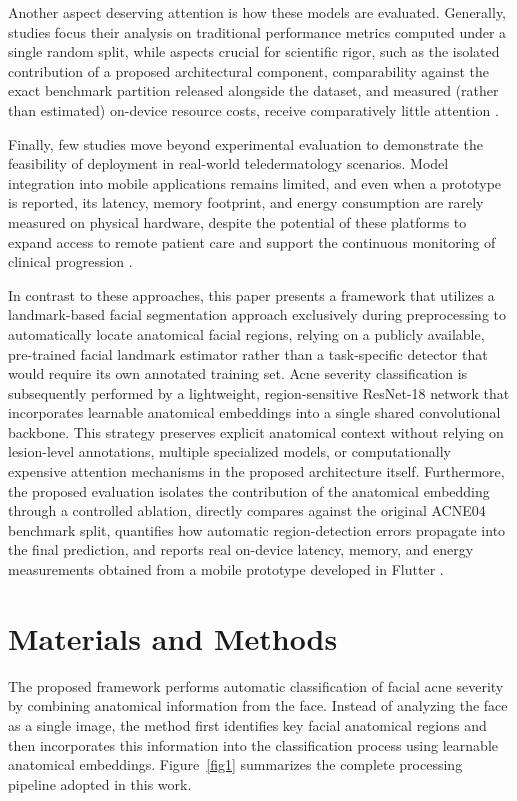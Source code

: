 \documentclass[conference]{IEEEtran}
\begin{document}
Another aspect deserving attention is how these models are evaluated. Generally, studies focus their analysis on traditional performance metrics computed under a single random split, while aspects crucial for scientific rigor, such as the isolated contribution of a proposed architectural component, comparability against the exact benchmark partition released alongside the dataset, and measured (rather than estimated) on-device resource costs, receive comparatively little attention \cite{b14}.

Finally, few studies move beyond experimental evaluation to demonstrate the feasibility of deployment in real-world teledermatology scenarios. Model integration into mobile applications remains limited, and even when a prototype is reported, its latency, memory footprint, and energy consumption are rarely measured on physical hardware, despite the potential of these platforms to expand access to remote patient care and support the continuous monitoring of clinical progression \cite{b13}.

In contrast to these approaches, this paper presents a framework that utilizes a landmark-based facial segmentation approach exclusively during preprocessing to automatically locate anatomical facial regions, relying on a publicly available, pre-trained facial landmark estimator rather than a task-specific detector that would require its own annotated training set. Acne severity classification is subsequently performed by a lightweight, region-sensitive ResNet-18 network that incorporates learnable anatomical embeddings into a single shared convolutional backbone. This strategy preserves explicit anatomical context without relying on lesion-level annotations, multiple specialized models, or computationally expensive attention mechanisms in the proposed architecture itself. Furthermore, the proposed evaluation isolates the contribution of the anatomical embedding through a controlled ablation, directly compares against the original ACNE04 benchmark split, quantifies how automatic region-detection errors propagate into the final prediction, and reports real on-device latency, memory, and energy measurements obtained from a mobile prototype developed in Flutter \cite{b28}.




\section{Materials and Methods}
The proposed framework performs automatic classification of facial acne severity by combining anatomical information from the face. Instead of analyzing the face as a single image, the method first identifies key facial anatomical regions and then incorporates this information into the classification process using learnable anatomical embeddings. Figure~\ref{fig1} summarizes the complete processing pipeline adopted in this work.
\end{document}

